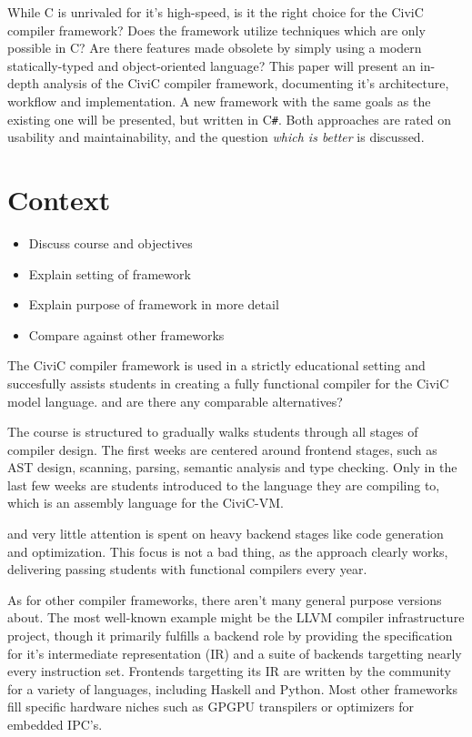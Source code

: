 \documentclass[twoside,openright]{uva-bachelor-thesis}
\newcommand{\cs}{C\texttt{\#}\xspace}
\begin{document}
		While C is unrivaled for it's high-speed, is it the right choice for the CiviC compiler framework? Does the framework utilize techniques which are only possible in C? Are there features made obsolete by simply using a modern statically-typed and object-oriented language? This paper will present an in-depth analysis of the CiviC compiler framework, documenting it's architecture, workflow and implementation. A new framework with the same goals as the existing one will be presented, but written in \cs. Both approaches are rated on usability and maintainability, and the  question \emph{which is better} is discussed.
		
			
	\section{Context}
		\begin{itemize}
			\item Discuss course and objectives
			\item Explain setting of framework
			\item Explain purpose of framework in more detail
			\item Compare against other frameworks
		\end{itemize}
	
		The CiviC compiler framework is used in a strictly educational setting and succesfully assists students in creating a  fully functional compiler for the CiviC model language.  and are there any comparable alternatives?
		
		The course is structured to gradually walks students through all stages of compiler design. The first weeks are centered around frontend stages, such as AST design, scanning, parsing, semantic analysis and type checking. Only in the last few weeks are students introduced to the language they are compiling to, which is an assembly language for the CiviC-VM. 
		
		and very little attention is spent on heavy backend stages like code generation and optimization. This focus is not a bad thing, as the approach clearly works, delivering passing students with functional compilers every year.
				
		As for other compiler frameworks, there aren't many general purpose versions about. The most well-known example might be the LLVM compiler infrastructure project\cite{lattner2002llvm}, though it primarily fulfills a backend role by providing the specification for it's intermediate representation (IR) and a suite of backends targetting nearly every instruction set. Frontends targetting its IR are written by the community for a variety of languages, including Haskell and Python. Most other frameworks fill specific hardware niches such as GPGPU transpilers or optimizers for embedded IPC's.
		
\end{document}

